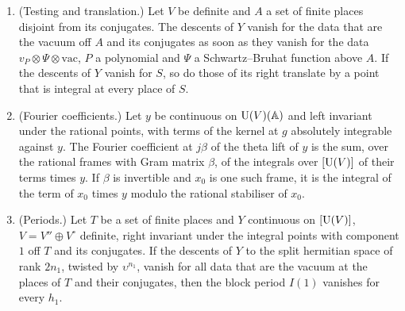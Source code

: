 \begin{theorem}\label{thm:B-periods}
\begin{enumerate}[label=\textup{(\alph*)}]
\item (Testing and translation.) Let $V$ be definite and $A$ a set of finite places disjoint from its conjugates. The descents of $Y$ vanish for the data that are the vacuum off $A$ and its conjugates as soon as
they vanish for the data $v_P\otimes\Psi\otimes\mathrm{vac}$, $P$ a polynomial and $\Psi$ a Schwartz--Bruhat function above $A$. If the descents of $Y$ vanish for $S$, so do those of its right translate by a point that
is integral at every place of $S$.
\item (Fourier coefficients.) Let $y$ be continuous on $\operatorname{U}(V)(\mathbb{A})$ and left invariant under the rational points, with terms of the kernel at $g$ absolutely integrable against $y$. The Fourier coefficient at $j\beta$
of the theta lift of $y$ is the sum, over the rational frames with Gram matrix $\beta$, of the integrals over $[\operatorname{U}(V)]$ of their terms times $y$. If $\beta$ is invertible and $x_0$ is one such frame, it is the integral
of the term of $x_0$ times $y$ modulo the rational stabiliser of $x_0$.
\item (Periods.) Let $T$ be a set of finite places and $Y$ continuous on $[\operatorname{U}(V)]$, $V=V''\oplus V^\circ$ definite, right invariant under the integral points with component $1$ off $T$ and its conjugates. If the descents
of $Y$ to the split hermitian space of rank $2n_1$, twisted by $\upsilon^{n_1}$, vanish for all data that are the vacuum at the places of $T$ and their conjugates, then the block period $I(1)$ vanishes for every $h_1$.
\end{enumerate}
\end{theorem}
